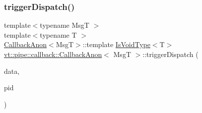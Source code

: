 \mbox{\label{structvt_1_1pipe_1_1callback_1_1_callback_anon_a5e4d44e498c5a31a452fa75aa3714fac}} 
\subsubsection{\texorpdfstring{trigger\+Dispatch()}{triggerDispatch()}\hspace{0.1cm}{\footnotesize\ttfamily [1/2]}}
{\footnotesize\ttfamily template$<$typename MsgT $>$ \\
template$<$typename T $>$ \\
\hyperlink{structvt_1_1pipe_1_1callback_1_1_callback_anon}{Callback\+Anon}$<$MsgT$>$\+::template \hyperlink{structvt_1_1pipe_1_1callback_1_1_callback_anon_a3aa19d4a1044d57ba4af22015331c20a}{Is\+Void\+Type}$<$T$>$ \hyperlink{structvt_1_1pipe_1_1callback_1_1_callback_anon}{vt\+::pipe\+::callback\+::\+Callback\+Anon}$<$ MsgT $>$\+::trigger\+Dispatch (\begin{DoxyParamCaption}\item[{\hyperlink{structvt_1_1pipe_1_1callback_1_1_callback_anon_ac503b95feb44bb0b60c1d69e1ed29074}{Signal\+Data\+Type} $\ast$}]{data,  }\item[{\hyperlink{namespacevt_ac9852acda74d1896f48f406cd72c7bd3}{Pipe\+Type} const \&}]{pid }\end{DoxyParamCaption})}

\mbox{\label{structvt_1_1pipe_1_1callback_1_1_callback_anon_a2d66de99b38b4c89f880c408346247de}} 
